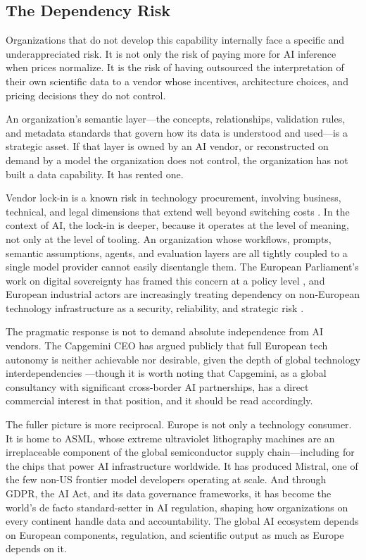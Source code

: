 \documentclass[man,12pt,donotrepeattitle]{apa7}
\begin{document}
\subsection{The Dependency Risk}

Organizations that do not develop this capability internally face a specific
and underappreciated risk. It is not only the risk of paying more for AI
inference when prices normalize. It is the risk of having outsourced the
interpretation of their own scientific data to a vendor whose incentives,
architecture choices, and pricing decisions they do not control.

An organization's semantic layer---the concepts, relationships, validation
rules, and metadata standards that govern how its data is understood and
used---is a strategic asset. If that layer is owned by an AI vendor, or
reconstructed on demand by a model the organization does not control, the
organization has not built a data capability. It has rented one.

Vendor lock-in is a known risk in technology procurement, involving
business, technical, and legal dimensions that extend well beyond switching
costs \parencite{oparamartins2016}. In the context of AI, the lock-in is
deeper, because it operates at the level of meaning, not only at the level
of tooling. An organization whose workflows, prompts, semantic assumptions,
agents, and evaluation layers are all tightly coupled to a single model
provider cannot easily disentangle them. The European Parliament's work on
digital sovereignty has framed this concern at a policy level
\parencite{madiega2020}, and European industrial actors are increasingly
treating dependency on non-European technology infrastructure as a security,
reliability, and strategic risk \parencite{chee2025}.

The pragmatic response is not to demand absolute independence from AI
vendors. The Capgemini CEO has argued publicly that full European tech
autonomy is neither achievable nor desirable, given the depth of global
technology interdependencies \parencite{marchandon2026}---though it is worth
noting that Capgemini, as a global consultancy with significant cross-border
AI partnerships, has a direct commercial interest in that position, and it
should be read accordingly.

The fuller picture is more reciprocal. Europe is not only a technology
consumer. It is home to ASML, whose extreme ultraviolet lithography machines
are an irreplaceable component of the global semiconductor supply chain---including
for the chips that power AI infrastructure worldwide. It has produced
Mistral, one of the few non-US frontier model developers operating at scale.
And through GDPR, the AI Act, and its data governance frameworks, it has
become the world's de facto standard-setter in AI regulation, shaping how
organizations on every continent handle data and accountability. The global
AI ecosystem depends on European components, regulation, and scientific
output as much as Europe depends on it.
\end{document}
